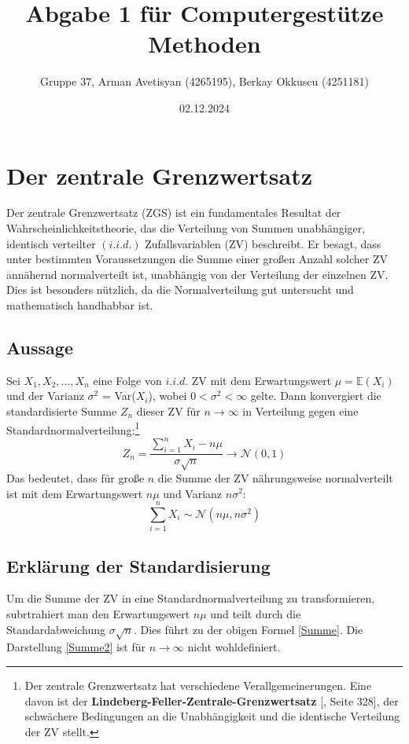 \documentclass{article}
\title{Abgabe 1 für Computergestütze Methoden}
\author{Gruppe 37, Arman Avetisyan (4265195), Berkay Okkuscu (4251181)}
\date{02.12.2024}
\begin{document}
\maketitle
\renewcommand{\contentsname}{Inhaltsverzeichnis}
\tableofcontents
\newpage
\section{Der zentrale Grenzwertsatz} 
     Der zentrale Grenzwertsatz (ZGS) ist ein fundamentales Resultat der Wahrscheinlichkeitstheorie, das die Verteilung von Summen unabhängiger, identisch verteilter $(i.i.d.)$ Zufallsvariablen (ZV) beschreibt. Er besagt, dass unter bestimmten Voraussetzungen die Summe einer großen Anzahl solcher ZV annähernd normalverteilt ist, unabhängig von der Verteilung der einzelnen ZV. Dies ist besonders nützlich, da die Normalverteilung gut untersucht und mathematisch handhabbar ist.


\subsection{Aussage}
    Sei $X_1,X_2,...,X_n$ eine Folge von $i.i.d.$ ZV mit dem Erwartungswert $\mu=\mathbb{E}(X_i)$ und der Varianz $\sigma^2$ = Var($X_i$), wobei $0 < \sigma^2 < \infty$ gelte. Dann konvergiert die standardisierte Summe $Z_n$ dieser ZV für $n \rightarrow \infty$ in Verteilung gegen eine Standardnormalverteilung:\footnote[1]{Der zentrale Grenzwertsatz hat verschiedene Verallgemeinerungen. Eine davon ist der \textbf{Lindeberg-Feller-Zentrale-Grenzwertsatz} [\cite{klenke2013}, Seite 328], der schwächere Bedingungen an die Unabhängigkeit und die identische Verteilung der ZV stellt.}
    \begin{equation}
        \label{Summe}
        Z_n = \frac{\sum_{i = 1}^nX_i-n\mu}{\sigma\sqrt{n}} \rightarrow \mathcal{N}(0,1)
    \end{equation}
    Das bedeutet, dass für große $n$ die Summe der ZV nährungsweise normalverteilt ist mit dem Erwartungswert $n\mu$ und Varianz $n\sigma^2$:
    \begin{equation}
    \label{Summe2}
        \sum_{i=1}^nX_i\sim\mathcal{N}(n\mu, n\sigma^2)
    \end{equation}


\subsection{Erklärung der Standardisierung}
    Um die Summe der ZV in eine Standardnormalverteilung zu transformieren, subrtrahiert man den Erwartungswert $n\mu$ und teilt durch die Standardabweichung $\sigma\sqrt{n}$. Dies führt zu der obigen Formel \eqref{Summe}. Die Darstellung \eqref{Summe2} ist für $n \rightarrow \infty$ nicht wohldefiniert.
\end{document}
